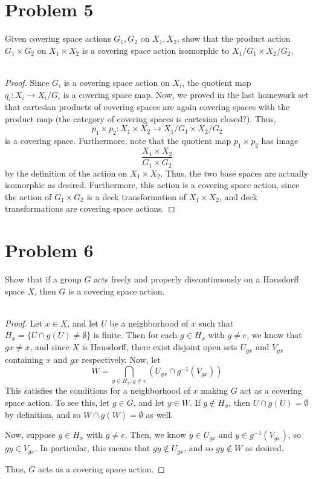 \documentclass[fontsize=11pt]{scrartcl} %
\numberwithin{equation}{section} %
\numberwithin{figure}{section} %
\numberwithin{table}{section} %
\begin{document}
\section*{Problem 5}
Given covering space actions $G_1,G_2$ on $X_1,X_2$, show that the product
action $G_1\times G_2$ on $X_1\times X_2$ is a covering space action isomorphic
to $X_1/{G_1}\times X_2/{G_2}$.
\\
\\
\begin{proof}
    Since $G_i$ is a covering space action on $X_i$, the quotient map
    $q_i:X_i\to X_i/{G_i}$ is a covering space map. Now, we proved in the last
    homework set that cartesian products of covering spaces are again covering
    spaces with the product map (the category of covering spaces is cartesian
    closed?). Thus, 
    \[
        p_1\times p_2:X_1\times X_2\to X_1/{G_1}\times X_2/{G_2}
    \]
    is a covering space. Furthermore, note that the quotient map $p_1\times p_2$
    has image
    \[
        \frac{X_1\times X_2}{G_1\times G_2}
    \]
    by the definition of the action on $X_1\times X_2$. Thus, the two base
    spaces are actually isomorphic as desired.
    Furthermore, this action is a covering space action, since the action of
    $G_1\times G_2$ is a deck transformation of $X_1\times X_2$, and deck
    transformations are covering space actions.
\end{proof}

\newpage

\section*{Problem 6}
Show that if a group $G$ acts freely and properly discontinuously on a Hausdorff
space $X$, then $G$ is a covering space action.
\\
\\
\begin{proof}
    Let $x\in X$, and let $U$ be a neighborhood of $x$ such that $H_x = \{U\cap g(U)
    \neq \emptyset\}$ is finite. Then for each $g\in H_x$ with $g\neq e$, we
    know that $gx\neq x$, and since $X$ is Hausdorff, there exist disjoint open
    sets $U_{gx}$ and $V_{gx}$ containing $x$ and $gx$ respectively. Now, let 
    \[
        W = \bigcap_{g\in H_x,g\neq e}\left( U_{gx}\cap g^{-1}(V_{gx}) \right)
    \]
    This satisfies the conditions for a neighborhood of $x$ making $G$ act as a
    covering space action. To see this, let $g\in G$, and let $y\in W$. If
    $g\not\in H_x$, then $U\cap g(U) = \emptyset$ by definition, and so $W\cap
    g(W) = \emptyset$ as well.

    Now, suppose $g\in H_x$ with $g\neq e$. Then, we know $y\in U_{gx}$ and
    $y\in g^{-1}(V_{gx})$, so $gy\in V_{gx}$. In particular, this means that
    $gy\not\in U_{gx}$, and so $gy\not\in W$ as desired.

    Thus, $G$ acts as a covering space action.
\end{proof}
\end{document}
